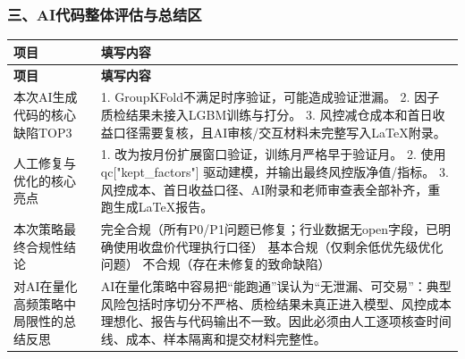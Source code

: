 \subsubsection*{三、AI代码整体评估与总结区}
\begingroup
\scriptsize
\setlength{\tabcolsep}{2pt}
\renewcommand{\arraystretch}{1.16}
\begin{longtable}{@{}L{0.28\textwidth}L{0.66\textwidth}@{}}
\toprule
\textbf{项目} & \textbf{填写内容} \\
\midrule
\endfirsthead
\toprule
\textbf{项目} & \textbf{填写内容} \\
\midrule
\endhead
\bottomrule
\endfoot
\bottomrule
\endlastfoot
本次AI生成代码的核心缺陷TOP3 & 1. GroupKFold不满足时序验证，可能造成验证泄漏。\newline{} 2. 因子质检结果未接入LGBM训练与打分。\newline{} 3. 风控减仓成本和首日收益口径需要复核，且AI审核/\allowbreak{}交互材料未完整写入LaTeX附录。 \\
人工修复与优化的核心亮点 & 1. 改为按月份扩展窗口验证，训练月严格早于验证月。\newline{} 2. 使用 qc["kept\_\allowbreak{}factors"] 驱动建模，并输出最终风控版净值/\allowbreak{}指标。\newline{} 3. 风控成本、首日收益口径、AI附录和老师审查表全部补齐，重跑生成LaTeX报告。 \\
本次策略最终合规性结论 & \checkedbox{} 完全合规（所有P0/\allowbreak{}P1问题已修复；行业数据无open字段，已明确使用收盘价代理执行口径）\newline{} \uncheckedbox{} 基本合规（仅剩余低优先级优化问题）\newline{} \uncheckedbox{} 不合规（存在未修复的致命缺陷） \\
对AI在量化高频策略中局限性的总结反思 & AI在量化策略中容易把“能跑通”误认为“无泄漏、可交易”：典型风险包括时序切分不严格、质检结果未真正进入模型、风控成本理想化、报告与代码输出不一致。因此必须由人工逐项核查时间线、成本、样本隔离和提交材料完整性。 \\
\end{longtable}
\endgroup
\clearpage
